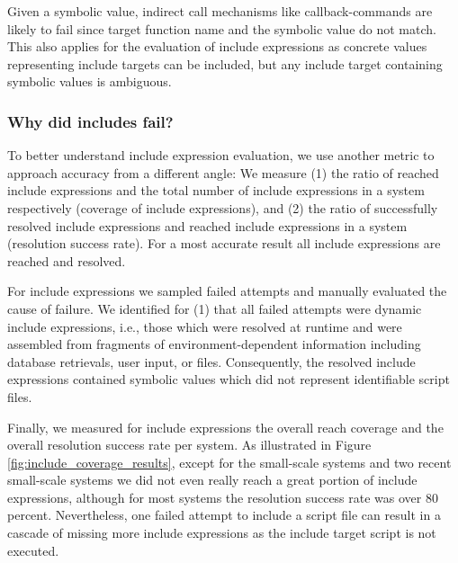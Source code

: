 \documentclass[preprint]{sig-alternate-05-2015}
\begin{document}
Given a symbolic value, indirect call mechanisms like callback-commands are likely to fail since target function name and the symbolic value do not match. This also applies for the evaluation of include expressions as concrete values representing include targets can be included, but any include target containing symbolic values is ambiguous.

\subsubsection{Why did includes fail?}
\label{WhyDidIncludesFail}
To better understand include expression evaluation, we use another metric to approach accuracy from a different angle: We measure (1) the ratio of reached include expressions and the total number of include expressions in a system respectively (coverage of include expressions), and (2) the ratio of successfully resolved include expressions and reached include expressions in a system (resolution success rate). For a most accurate result all include expressions are reached and resolved.

For include expressions we sampled failed attempts and manually evaluated the cause of failure. We identified for (1) that all failed attempts were dynamic include expressions, i.e., those which were resolved at runtime and were assembled from fragments of environment-dependent information including database retrievals, user input, or files. Consequently, the resolved include expressions contained symbolic values which did not represent identifiable script files.

Finally, we measured for include expressions the overall reach coverage and the overall resolution success rate per system. As illustrated in Figure \ref{fig:include_coverage_results}, except for the small-scale systems and two recent small-scale systems we did not even really reach a great portion of include expressions, although for most systems the resolution success rate was over 80 percent. Nevertheless, one failed attempt to include a script file can result in a cascade of missing more include expressions as the include target script is not executed.
\end{document}
